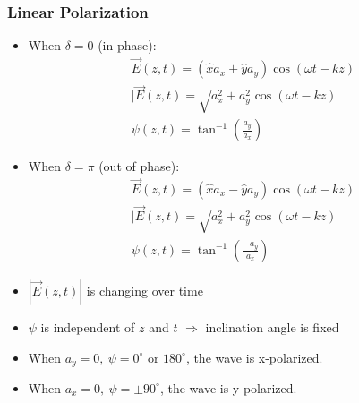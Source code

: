 \documentclass[a4paper]{article}
\begin{document}
\subsubsection{Linear Polarization}
\begin{itemize}
    \item When $\delta = 0$ (in phase):
    $$\begin{array}{c}
         \overrightarrow{E}(z, t) = (\hat{x}a_x+\hat{y}a_y)\cos(\omega t-kz)\\
         |\overrightarrow{E}(z, t) = \sqrt{a_x^2+a_y^2}\cos(\omega t-kz)\\
         \psi(z, t) = \tan^{-1}\left(\displaystyle\frac{a_y}{a_x}\right)
    \end{array}$$
    \item When $\delta = \pi$ (out of phase):
    $$\begin{array}{cc}
         \overrightarrow{E}(z, t) = (\hat{x}a_x-\hat{y}a_y)\cos(\omega t-kz)\\
         |\overrightarrow{E}(z, t) = \sqrt{a_x^2+a_y^2}\cos(\omega t-kz)\\
         \psi(z, t) = \tan^{-1}\left(\displaystyle\frac{-a_y}{a_x}\right)
    \end{array}$$
    \item $|\overrightarrow{E}(z, t)|$ is changing over time
    \item $\psi$ is independent of $z$ and $t$ $\Rightarrow$ inclination angle is fixed 
    \item When $a_y = 0,\ \psi = 0^\circ$ or $180^\circ$, the wave is x-polarized.
    \item When $a_x = 0,\ \psi = \pm 90^\circ$, the wave is y-polarized.
\end{itemize}
\end{document}
